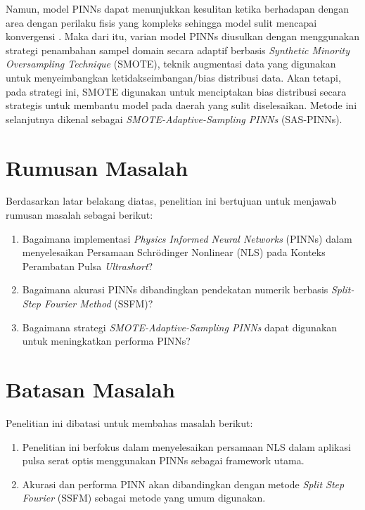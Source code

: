 Namun, model PINNs dapat menunjukkan kesulitan ketika berhadapan dengan area dengan perilaku fisis yang kompleks sehingga model sulit mencapai konvergensi . Maka dari itu, varian model PINNs diusulkan dengan menggunakan strategi penambahan sampel domain secara adaptif berbasis \emph{Synthetic Minority Oversampling Technique} (SMOTE), teknik augmentasi data yang digunakan untuk menyeimbangkan ketidakseimbangan/bias distribusi data. Akan tetapi, pada strategi ini, SMOTE digunakan untuk menciptakan bias distribusi secara strategis untuk membantu model pada daerah yang sulit diselesaikan. Metode ini selanjutnya dikenal sebagai \emph{SMOTE-Adaptive-Sampling PINNs} (SAS-PINNs).

\section{Rumusan Masalah}
Berdasarkan latar belakang diatas, penelitian ini bertujuan untuk menjawab rumusan masalah sebagai berikut:
\begin{enumerate}
	\item Bagaimana implementasi \textit{Physics Informed Neural Networks} (PINNs) dalam menyelesaikan Persamaan Schr\"{o}dinger Nonlinear (NLS) pada Konteks Perambatan Pulsa \emph{Ultrashort}?
    \item Bagaimana akurasi PINNs dibandingkan pendekatan numerik berbasis \emph{Split-Step Fourier Method} (SSFM)?
    
	\item Bagaimana strategi \emph{SMOTE-Adaptive-Sampling PINNs} dapat digunakan untuk meningkatkan performa PINNs?
\end{enumerate}


\section{Batasan Masalah}
Penelitian ini dibatasi untuk membahas masalah berikut:
\begin{enumerate}
	\item Penelitian ini berfokus dalam menyelesaikan persamaan NLS dalam aplikasi pulsa serat optis menggunakan PINNs sebagai framework utama.
	\item Akurasi dan performa PINN akan dibandingkan dengan metode \textit{Split Step Fourier} (SSFM) sebagai metode yang umum digunakan.
\end{enumerate}

